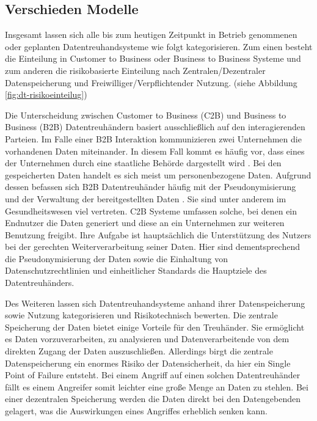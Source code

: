 \documentclass{scrreprt}
\begin{document}
\subsection{Verschieden Modelle}
Insgesamt lassen sich alle bis zum heutigen Zeitpunkt in Betrieb genommenen oder geplanten Datentreuhandsysteme wie folgt kategorisieren. Zum einen besteht die Einteilung in Customer to Business oder Business to Business Systeme und zum anderen die risikobasierte Einteilung nach Zentralen/Dezentraler Datenspeicherung und Freiwilliger/Verpflichtender Nutzung. (siehe Abbildung \ref{fig:dt-risikoeinteilug})

Die Unterscheidung zwischen Customer to Business (C2B) und Business to Business (B2B) Datentreuhändern basiert ausschließlich auf den interagierenden Parteien. Im Falle einer B2B Interaktion kommunizieren zwei Unternehmen die vorhandenen Daten miteinander. In diesem Fall kommt es häufig vor, dass eines der Unternehmen durch eine staatliche Behörde dargestellt wird . Bei den gespeicherten Daten handelt es sich meist um personenbezogene Daten. Aufgrund dessen befassen sich B2B Datentreuhänder häufig mit der Pseudonymisierung und der Verwaltung der bereitgestellten Daten . Sie sind unter anderem im Gesundheitswesen viel vertreten. \cite{dt-blankertz2020datentreuhandmodelle}
C2B Systeme umfassen solche, bei denen ein Endnutzer die Daten generiert und diese an ein Unternehmen zur weiteren Benutzung freigibt. Ihre Aufgabe ist hauptsächlich die Unterstützung des Nutzers bei der gerechten Weiterverarbeitung seiner Daten. \cite{dt-blankertz2020datentreuhandmodelle} Hier sind dementsprechend die Pseudonymisierung der Daten sowie die Einhaltung von Datenschutzrechtlinien und einheitlicher Standards die Hauptziele des Datentreuhänders.

Des Weiteren lassen sich Datentreuhandsysteme anhand ihrer Datenspeicherung sowie Nutzung kategorisieren und Risikotechnisch bewerten. Die zentrale Speicherung der Daten bietet einige Vorteile für den Treuhänder. Sie ermöglicht es Daten vorzuverarbeiten, zu analysieren und Datenverarbeitende von dem direkten Zugang der Daten auszuschließen. Allerdings birgt die zentrale Datenspeicherung ein enormes Risiko der Datensicherheit, da hier ein Single Point of Failure entsteht. Bei einem Angriff auf einen solchen Datentreuhänder fällt es einem Angreifer somit leichter eine große Menge an Daten zu stehlen. Bei einer dezentralen Speicherung werden die Daten direkt bei den Datengebenden gelagert, was die Auswirkungen eines Angriffes erheblich senken kann. 
\\
\end{document}
